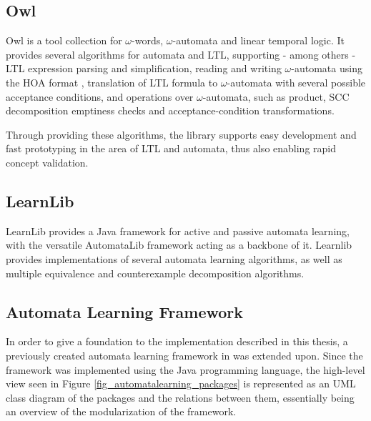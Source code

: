 \subsection{Owl} \label{subsec_owl}

Owl \cite{Owl} is a tool collection for $\omega$-words, $\omega$-automata and linear temporal logic. It provides several algorithms for automata and LTL, supporting - among others - LTL expression parsing and simplification, reading and writing $\omega$-automata using the HOA format \cite{HOAFormat}, translation of LTL formula to $\omega$-automata with several possible acceptance conditions, and operations over $\omega$-automata, such as product, SCC decomposition emptiness checks and acceptance-condition transformations.

Through providing these algorithms, the library supports easy development and fast prototyping in the area of LTL and automata, thus also enabling rapid concept validation.

\subsection{LearnLib} \label{subsec_learnlib}

LearnLib\cite{10.1007/978-3-319-21690-4_32} provides a Java framework for active and passive automata learning, with the versatile AutomataLib framework acting as a backbone of it. Learnlib provides implementations of several automata learning algorithms, as well as multiple equivalence and counterexample decomposition algorithms.

\subsection{Automata Learning Framework} \label{subsec_automatonlearning}
In order to give a foundation to the implementation described in this thesis, a previously created automata learning framework in \cite{Barcsa-Szabo2019} was extended upon. Since the framework was implemented using the Java programming language, the high-level view seen in Figure \ref{fig_automatalearning_packages} is represented as an UML class diagram of the packages and the relations between them, essentially being an overview of the modularization of the framework. 


